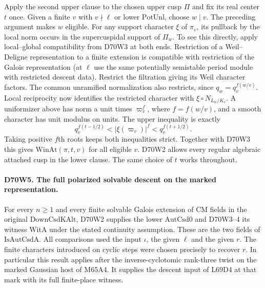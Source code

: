 Apply the second upper clause to the chosen upper cusp $\Pi$ and
fix its real center $t$ once. Given a finite $v$ with
$v\nmid\ell$ or lower $\mathrm{PotUnl}$, choose $w\mid v$. The preceding
argument makes $w$ eligible. For any support character $\xi$ of
$\pi_v$, its pullback by the local norm occurs in the supercuspidal
support of $\Pi_w$. To see this directly, apply local--global
compatibility from D70W3 at both ends. Restriction of a
Weil--Deligne representation to a finite extension is compatible
with restriction of the Galois representation (at $\ell$ use the
same potentially semistable period module with restricted descent
data). Restrict the filtration giving its Weil character factors.
The common unramified normalization also restricts, since
$q_w=q_v^{f(w/v)}$. Local reciprocity now identifies the restricted
character with $\xi\circ N_{L_w/K_v}$.
A uniformizer above has norm a unit times $\varpi_v^f$, where
$f=f(w/v)$, and a smooth character has unit modulus on units.
The upper inequality is exactly
\[
 q_v^{f(t-1/2)}< |\xi(\varpi_v)|^f <q_v^{f(t+1/2)} .
\]
Taking positive $f$th roots keeps both inequalities strict.
Together with D70W3 this gives $\mathrm{WinAt}(\pi,t,v)$ for all
eligible $v$. D70W2 allows every regular algebraic attached cusp
in the lower clause. The same choice of $t$ works throughout.

\paragraph{D70W5. The full polarized solvable descent on the marked representation.}
For every $n\ge1$ and every finite solvable Galois extension of CM
fields in the original $\mathrm{DownCsdKAlt}$, D70W2 supplies the
lower $\mathrm{AutCsd0}$ and D70W3--4 its witness $\mathrm{WitA}$
under the stated continuity assumption. These are the two fields of
$\mathrm{IsAutCsdA}$. All comparisons used the input $\iota$, the
given $\ell$ and the given $r$. The finite characters introduced on
cyclic steps were chosen precisely to recover $r$.
In particular this result applies after the inverse-cyclotomic
rank-three twist on the marked Gaussian host of M65A4.
It supplies the descent input of L69D4 at that mark with its
full finite-place witness.

